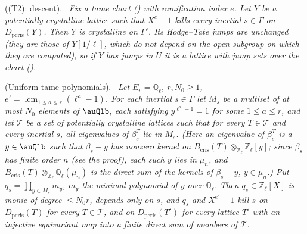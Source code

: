\documentclass[10pt]{amsart}
\theoremstyle{definition}
\theoremstyle{remark}
\newcommand{\Z}{\mathbb Z}
\newcommand{\Q}{\mathbb Q}
\providecommand{\pkwB}{B_{\mathrm{cris}}}
\providecommand{\pkwD}{D_{\mathrm{pcris}}}
\newenvironment{quotedthm}[2]{\par\medskip\noindent\begingroup
  \textbf{#1}#2.\ \itshape\ignorespaces}{\endgroup\par\medskip}
\begin{document}
\begin{quotedthm}{\cite[Theorem~9.9]{P56}}{ ((T2): descent)}
Fix a tame chart ({\cite[Definition~9.5]{P56}}) with ramification index $e$. Let $Y$ be a potentially
crystalline lattice such that $X^e-1$ kills every inertial $s\in\Gamma$ on $\pkwD(Y)$. Then $Y$ is
crystalline on $\Gamma'$. Its Hodge--Tate jumps are unchanged (they are those of $Y[1/\ell]$, which do not
depend on the open subgroup on which they are computed), so if $Y$ has jumps in $U$ it is a lattice with
jump sets over the chart ({\cite[Definition~3.4]{P56}}).
\end{quotedthm}

\begin{quotedthm}{\cite[Proposition~9.23]{P56}}{ (Uniform tame polynomials)}
Let $E_v=\Q_\ell$, $r,N_0\ge1$, $e'=\operatorname{lcm}_{1\le a\le r}(\ell^a-1)$. For each inertial $s\in\Gamma$ let
$M_s$ be a multiset of at most $N_0$ elements of $\auQlb$, each satisfying $y^{\ell^a-1}=1$ for some $1\le a\le r$,
and let $\mathcal T$ be a set of potentially crystalline lattices such that for every $T\in\mathcal T$ and every
inertial $s$, all eigenvalues of $\beta_s^T$ lie in $M_s$. (Here an eigenvalue of $\beta_s^T$ is a
$y\in\auQlb$ such that $\beta_s-y$ has nonzero kernel on $\pkwB(T)\otimes_{\Z_\ell}\Z_\ell[y]$; since $\beta_s$ has
finite order $n$ (see the proof), each such $y$ lies in $\mu_n$, and $\pkwB(T)\otimes_{\Z_\ell}\Q_\ell(\mu_n)$ is
the direct sum of the kernels of $\beta_s-y$, $y\in\mu_n$.) Put $q_s=\prod_{y\in M_s}m_y$, $m_y$ the minimal
polynomial of $y$ over $\Q_\ell$. Then $q_s\in\Z_\ell[X]$ is monic of degree $\le N_0r$, depends only on $s$, and
$q_s$ and $X^{e'}-1$ kill $s$ on $\pkwD(T)$ for every $T\in\mathcal T$, and on $\pkwD(T')$ for every lattice $T'$
with an injective equivariant map into a finite direct sum of members of $\mathcal T$.
\end{quotedthm}
\end{document}
